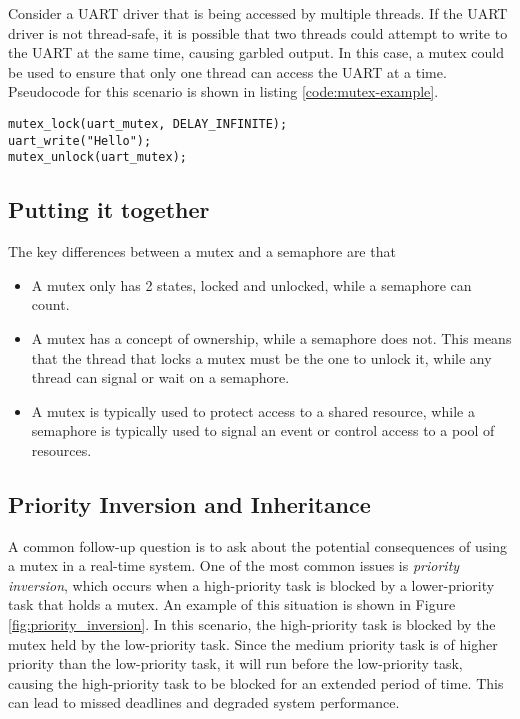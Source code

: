 \documentclass[main.tex]{subfiles}
\begin{document}
\noindent Consider a UART driver that is being accessed by multiple threads. If the UART driver is not thread-safe, it is possible that two threads could attempt to write to the UART at the same time, causing garbled output. In this case, a mutex could be used to ensure that only one thread can access the UART at a time. Pseudocode for this scenario is shown in listing \ref{code:mutex-example}.
\begin{lstlisting}[caption={Example of Mutex Usage}, label={code:mutex-example}]
mutex_lock(uart_mutex, DELAY_INFINITE);
uart_write("Hello");
mutex_unlock(uart_mutex);
\end{lstlisting}

\subsection{Putting it together}
The key differences between a mutex and a semaphore are that
\begin{itemize}
    \item A mutex only has 2 states, locked and unlocked, while a semaphore can count.
    \item A mutex has a concept of ownership, while a semaphore does not. This means that the thread that locks a mutex must be the one to unlock it, while any thread can signal or wait on a semaphore.
    \item A mutex is typically used to protect access to a shared resource, while a semaphore is typically used to signal an event or control access to a pool of resources.
\end{itemize}

\subsection{Priority Inversion and Inheritance}
A common follow-up question is to ask about the potential consequences of using a mutex in a real-time system. One of the most common issues is \textit{priority inversion}, which occurs when a high-priority task is blocked by a lower-priority task that holds a mutex. An example of this situation is shown in Figure \ref{fig:priority_inversion}. In this scenario, the high-priority task is blocked by the mutex held by the low-priority task. Since the medium priority task is of higher priority than the low-priority task, it will run before the low-priority task, causing the high-priority task to be blocked for an extended period of time. This can lead to missed deadlines and degraded system performance.
\end{document}
